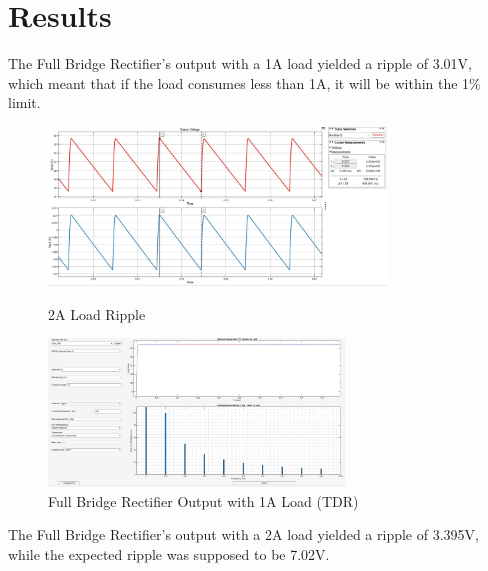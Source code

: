 \documentclass[12pt]{article}
\begin{document}
\newpage
\section*{Results}

The Full Bridge Rectifier's output with a 1A load yielded a ripple of 3.01V, which meant that if the load consumes less than 1A, it will be within the 1\% limit.

\begin{figure}[h]
    \centering
    \includegraphics[width=0.8\textwidth]{img/2A_n.jpg}
    \caption{2A Load Ripple}

    \centering
    \includegraphics[width=0.7\textwidth]{img/FBR_1A.jpg}
    \caption{Full Bridge Rectifier Output with 1A Load (TDR)}
\end{figure}
\newpage
The Full Bridge Rectifier's output with a 2A load yielded a ripple of 3.395V, while the expected ripple was supposed to be 7.02V.
\end{document}
